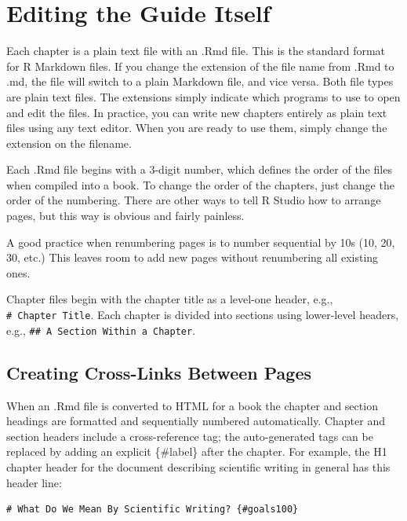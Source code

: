 \documentclass[
]{book}
\begin{document}
\hypertarget{editing-the-guide-itself}{%
\section*{Editing the Guide Itself}\label{editing-the-guide-itself}}

Each chapter is a plain text file with an .Rmd file. This is the standard format for R Markdown files. If you change the extension of the file name from .Rmd to .md, the file will switch to a plain Markdown file, and vice versa. Both file types are plain text files. The extensions simply indicate which programs to use to open and edit the files. In practice, you can write new chapters entirely as plain text files using any text editor. When you are ready to use them, simply change the extension on the filename.

Each .Rmd file begins with a 3-digit number, which defines the order of the files when compiled into a book. To change the order of the chapters, just change the order of the numbering. There are other ways to tell R Studio how to arrange pages, but this way is obvious and fairly painless.

A good practice when renumbering pages is to number sequential by 10s (10, 20, 30, etc.) This leaves room to add new pages without renumbering all existing ones.

Chapter files begin with the chapter title as a level-one header, e.g., \texttt{\#\ Chapter\ Title}. Each chapter is divided into sections using lower-level headers, e.g., \texttt{\#\#\ A\ Section\ Within\ a\ Chapter}.

\hypertarget{creating-cross-links-between-pages}{%
\subsection*{Creating Cross-Links Between Pages}\label{creating-cross-links-between-pages}}

When an .Rmd file is converted to HTML for a book the chapter and section headings are formatted and sequentially numbered automatically. Chapter and section headers include a cross-reference tag; the auto-generated tags can be replaced by adding an explicit \{\#label\} after the chapter. For example, the H1 chapter header for the document describing scientific writing in general has this header line:

\begin{verbatim}
# What Do We Mean By Scientific Writing? {#goals100}
\end{verbatim}
\end{document}
